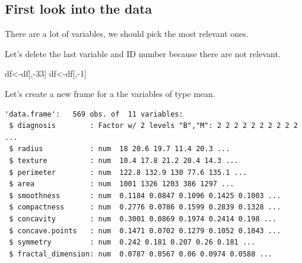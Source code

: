 \documentclass[
  11pt,
]{article}
\newenvironment{Shaded}{\begin{snugshade}}{\end{snugshade}}
\newcommand{\DecValTok}[1]{\textcolor[rgb]{0.00,0.00,0.81}{#1}}
\newcommand{\NormalTok}[1]{#1}
\newcommand{\OtherTok}[1]{\textcolor[rgb]{0.56,0.35,0.01}{#1}}
\newcommand{\SpecialCharTok}[1]{\textcolor[rgb]{0.00,0.00,0.00}{#1}}
\begin{document}
\hypertarget{first-look-into-the-data}{%
\subsection{First look into the data}\label{first-look-into-the-data}}

There are a lot of variables, we should pick the most relevant ones.

Let's delete the last variable and ID number because there are not
relevant.

\begin{Shaded}
\begin{Highlighting}[]
\NormalTok{df}\OtherTok{\textless{}{-}}\NormalTok{df[,}\SpecialCharTok{{-}}\DecValTok{33}\NormalTok{]}
\NormalTok{df}\OtherTok{\textless{}{-}}\NormalTok{df[,}\SpecialCharTok{{-}}\DecValTok{1}\NormalTok{]}
\end{Highlighting}
\end{Shaded}

Let's create a new frame for a the variables of type mean.

\begin{verbatim}
'data.frame':   569 obs. of  11 variables:
 $ diagnosis        : Factor w/ 2 levels "B","M": 2 2 2 2 2 2 2 2 2 2 ...
 $ radius           : num  18 20.6 19.7 11.4 20.3 ...
 $ texture          : num  10.4 17.8 21.2 20.4 14.3 ...
 $ perimeter        : num  122.8 132.9 130 77.6 135.1 ...
 $ area             : num  1001 1326 1203 386 1297 ...
 $ smoothness       : num  0.1184 0.0847 0.1096 0.1425 0.1003 ...
 $ compactness      : num  0.2776 0.0786 0.1599 0.2839 0.1328 ...
 $ concavity        : num  0.3001 0.0869 0.1974 0.2414 0.198 ...
 $ concave.points   : num  0.1471 0.0702 0.1279 0.1052 0.1043 ...
 $ symmetry         : num  0.242 0.181 0.207 0.26 0.181 ...
 $ fractal_dimension: num  0.0787 0.0567 0.06 0.0974 0.0588 ...
\end{verbatim}
\end{document}
